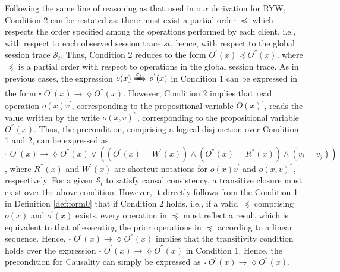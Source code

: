 \documentclass[journal,compsoc]{IEEEtran}
\begin{document}
  Following the same line of reasoning as that  used in our derivation for RYW, Condition 2 can be restated as: there must exist a partial order $\preccurlyeq$ which respects the order specified among the operations performed by each client, i.e., with respect to each observed session trace $\mathit{st}$, hence, with respect to the global session trace $\mathcal{S}_t$. Thus, Condition 2 reduces to the form ${\mathit{O}}^{'}(x)  \preccurlyeq {\mathit{O}}^{''}(x)  $, where $\preccurlyeq$ is a partial order with respect to operations in the global session trace.
  As in previous cases, the expression $\mathit{o}(x) \xRightarrow{\sigma_i} \mathit{o}^{'}(x)$ in Condition 1 %
  can be expressed in the
 form $ \square\;  {\mathit{O}}^{'}(x) \rightarrow \lozenge {\mathit{O}}^{''}(x)$. %
 However, Condition 2 implies that read operation $\mathit{o}(x){v}^{'}$, corresponding to the propositional variable ${\mathit{O}}(x)^{'} $, reads the value
 written by the write $\mathit{o}(x,v)^{''}$, corresponding to the propositional variable  ${\mathit{O}}^{''}(x)$. Thus, the precondition, comprising a logical disjunction over Condition 1 and 2, can be expressed as %
  $  \square\;  {\mathit{O}}^{'}(x) \rightarrow \lozenge {\mathit{O}}^{''}(x) \vee
 \left( \left( {\mathit{O}}^{'}(x) = {W}^{'}(x) \right) \wedge \left( {\mathit{O}}^{''}(x) = {R}^{''}(x) \right) \wedge
   \left( v_i = v_j \right) \right)$, where $ {R}^{''}(x)$ and $ {W}^{'}(x)$ are shortcut notations for   $\mathit{o}(x){v}^{'}$ and $\mathit{o}(x,v)^{''}$, respectively. For a given $\mathcal{S}_t$ to satisfy causal consistency,  a transitive closure
must exist over the above condition. %
  However, it directly follows from the Condition 1 in Definition \ref{def:form0} that if Condition 2 holds, i.e., if a valid $\preccurlyeq$ comprising $\mathit{o}(x)$  and $\mathit{o}^{'}(x) $ exists,  every operation in $ \preccurlyeq$ must reflect a result which is equivalent to that of executing the prior operations in $ \preccurlyeq$ according to a linear sequence. Hence, ${ \square\;  \mathit{O}}^{'}(x) \rightarrow \lozenge {\mathit{O}}^{''}(x)$ implies that the transitivity condition holds over the expression $ \square\;  {\mathit{O}}^{'}(x) \rightarrow \lozenge {\mathit{O}}^{''}(x)$  in Condition 1. Hence, the precondition for Causality can simply be expressed as $ \square\;  {\mathit{O}}^{'}(x)  \rightarrow \lozenge  {\mathit{O}}^{''}(x)$. %
\end{document}
